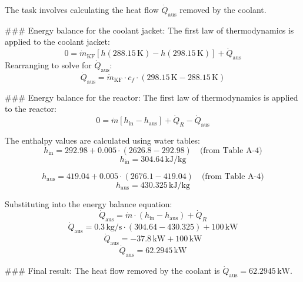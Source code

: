The task involves calculating the heat flow \( \dot{Q}_{\text{aus}} \) removed by the coolant.  

### Energy balance for the coolant jacket:
The first law of thermodynamics is applied to the coolant jacket:  
\[
0 = \dot{m}_{\text{KF}} \left[ h(288.15 \, \text{K}) - h(298.15 \, \text{K}) \right] + \dot{Q}_{\text{aus}}
\]  
Rearranging to solve for \( \dot{Q}_{\text{aus}} \):  
\[
\dot{Q}_{\text{aus}} = \dot{m}_{\text{KF}} \cdot c_f \cdot \left( 298.15 \, \text{K} - 288.15 \, \text{K} \right)
\]  

### Energy balance for the reactor:
The first law of thermodynamics is applied to the reactor:  
\[
0 = \dot{m} \left[ h_{\text{in}} - h_{\text{aus}} \right] + \dot{Q}_R - \dot{Q}_{\text{aus}}
\]  

The enthalpy values are calculated using water tables:  
\[
h_{\text{in}} = 292.98 + 0.005 \cdot (2626.8 - 292.98) \quad \text{(from Table A-4)}
\]  
\[
h_{\text{in}} = 304.64 \, \text{kJ/kg}
\]  

\[
h_{\text{aus}} = 419.04 + 0.005 \cdot (2676.1 - 419.04) \quad \text{(from Table A-4)}
\]  
\[
h_{\text{aus}} = 430.325 \, \text{kJ/kg}
\]  

Substituting into the energy balance equation:  
\[
\dot{Q}_{\text{aus}} = \dot{m} \cdot \left( h_{\text{in}} - h_{\text{aus}} \right) + \dot{Q}_R
\]  
\[
\dot{Q}_{\text{aus}} = 0.3 \, \text{kg/s} \cdot \left( 304.64 - 430.325 \right) + 100 \, \text{kW}
\]  
\[
\dot{Q}_{\text{aus}} = -37.8 \, \text{kW} + 100 \, \text{kW}
\]  
\[
\dot{Q}_{\text{aus}} = 62.2945 \, \text{kW}
\]  

### Final result:
The heat flow removed by the coolant is \( \dot{Q}_{\text{aus}} = 62.2945 \, \text{kW} \).